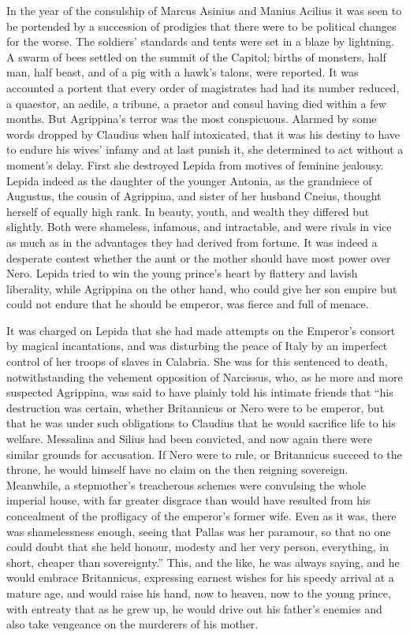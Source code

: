 In the year of the consulship of Marcus Asinius and Manius Acilius it was seen to be portended by a succession of prodigies that there were to be political changes for the worse. The soldiers' standards and tents were set in a blaze by lightning. A swarm of bees settled on the summit of the Capitol; births of monsters, half man, half beast, and of a pig with a hawk's talons, were reported. It was accounted a portent that every order of magistrates had had its number reduced, a quaestor, an aedile, a tribune, a praetor and consul having died within a few months. But Agrippina's terror was the most conspicuous. Alarmed by some words dropped by Claudius when half intoxicated, that it was his destiny to have to endure his wives' infamy and at last punish it, she determined to act without a moment's delay. First she destroyed Lepida from motives of feminine jealousy. Lepida indeed as the daughter of the younger Antonia, as the grandniece of Augustus, the cousin of Agrippina, and sister of her husband Cneius, thought herself of equally high rank. In beauty, youth, and wealth they differed but slightly. Both were shameless, infamous, and intractable, and were rivals in vice as much as in the advantages they had derived from fortune. It was indeed a desperate contest whether the aunt or the mother should have most power over Nero. Lepida tried to win the young prince's heart by flattery and lavish liberality, while Agrippina on the other hand, who could give her son empire but could not endure that he should be emperor, was fierce and full of menace.


It was charged on Lepida that she had made attempts on the Emperor's consort by magical incantations, and was disturbing the peace of Italy by an imperfect control of her troops of slaves in Calabria. She was for this sentenced to death, notwithstanding the vehement opposition of Narcissus, who, as he more and more suspected Agrippina, was said to have plainly told his intimate friends that ``his destruction was certain, whether Britannicus or Nero were to be emperor, but that he was under such obligations to Claudius that he would sacrifice life to his welfare. Messalina and Silius had been convicted, and now again there were similar grounds for accusation. If Nero were to rule, or Britannicus succeed to the throne, he would himself have no claim on the then reigning sovereign. Meanwhile, a stepmother's treacherous schemes were convulsing the whole imperial house, with far greater disgrace than would have resulted from his concealment of the profligacy of the emperor's former wife. Even as it was, there was shamelessness enough, seeing that Pallas was her paramour, so that no one could doubt that she held honour, modesty and her very person, everything, in short, cheaper than sovereignty.'' This, and the like, he was always saying, and he would embrace Britannicus, expressing earnest wishes for his speedy arrival at a mature age, and would raise his hand, now to heaven, now to the young prince, with entreaty that as he grew up, he would drive out his father's enemies and also take vengeance on the murderers of his mother.

